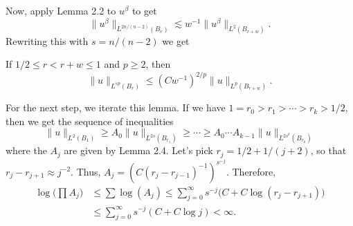 Now, apply Lemma 2.2 to $u^\beta$ to get
\[\|u^\beta\|_{L^{2n/(n-2)}(B_r)}\lesssim w^{-1}\|u^\beta\|_{L^2(B_{r+w})}.\]
Rewriting this with $s=n/(n-2)$ we get
\begin{lemma}[2.4]
If $1/2\leq r<r+w\leq1$ and $p\geq2$, then
\[\|u\|_{L^{sp}(B_r)}\leq(Cw^{-1})^{2/p}\|u\|_{L^p(B_{r+w})}.\]
\end{lemma}
For the next step, we iterate this lemma. If we have $1=r_0>r_1>\cdots>r_k>1/2$, then we get the sequence of inequalities
\[\|u\|_{L^2(B_1)}\geq A_0\|u\|_{L^{2s}(B_{r_1})}\geq\cdots\geq A_0\cdots A_{k-1}\|u\|_{L^{2s^k}(B_{r_k})}\]
where the $A_j$ are given by Lemma 2.4. Let's pick $r_j=1/2+1/(j+2)$, so that $r_j-r_{j+1}\approx j^{-2}$. Thus, $A_j=(C(r_j-r_{j-1})^{-1})^{s^{-j}}$. Therefore,
\begin{align*}
\log\Big(\prod A_j\Big)&\leq\sum\log(A_j)\leq\sum_{j=0}^\infty s^{-j}\big(C+C\log(r_j-r_{j+1})\big)\\
&\leq\sum_{j=0}^\infty s^{-j}(C+C\log j)<\infty.
\end{align*}
